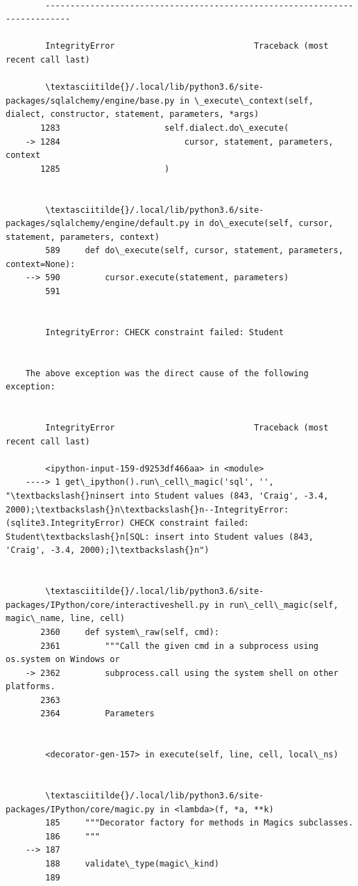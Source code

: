 \documentclass[11pt]{article}
\begin{document}
    \begin{Verbatim}[commandchars=\\\{\}]

        ---------------------------------------------------------------------------

        IntegrityError                            Traceback (most recent call last)

        \textasciitilde{}/.local/lib/python3.6/site-packages/sqlalchemy/engine/base.py in \_execute\_context(self, dialect, constructor, statement, parameters, *args)
       1283                     self.dialect.do\_execute(
    -> 1284                         cursor, statement, parameters, context
       1285                     )


        \textasciitilde{}/.local/lib/python3.6/site-packages/sqlalchemy/engine/default.py in do\_execute(self, cursor, statement, parameters, context)
        589     def do\_execute(self, cursor, statement, parameters, context=None):
    --> 590         cursor.execute(statement, parameters)
        591 


        IntegrityError: CHECK constraint failed: Student

        
    The above exception was the direct cause of the following exception:


        IntegrityError                            Traceback (most recent call last)

        <ipython-input-159-d9253df466aa> in <module>
    ----> 1 get\_ipython().run\_cell\_magic('sql', '', "\textbackslash{}ninsert into Student values (843, 'Craig', -3.4, 2000);\textbackslash{}n\textbackslash{}n--IntegrityError: (sqlite3.IntegrityError) CHECK constraint failed: Student\textbackslash{}n[SQL: insert into Student values (843, 'Craig', -3.4, 2000);]\textbackslash{}n")
    

        \textasciitilde{}/.local/lib/python3.6/site-packages/IPython/core/interactiveshell.py in run\_cell\_magic(self, magic\_name, line, cell)
       2360     def system\_raw(self, cmd):
       2361         """Call the given cmd in a subprocess using os.system on Windows or
    -> 2362         subprocess.call using the system shell on other platforms.
       2363 
       2364         Parameters


        <decorator-gen-157> in execute(self, line, cell, local\_ns)


        \textasciitilde{}/.local/lib/python3.6/site-packages/IPython/core/magic.py in <lambda>(f, *a, **k)
        185     """Decorator factory for methods in Magics subclasses.
        186     """
    --> 187 
        188     validate\_type(magic\_kind)
        189 



\end{Verbatim}
\end{document}

